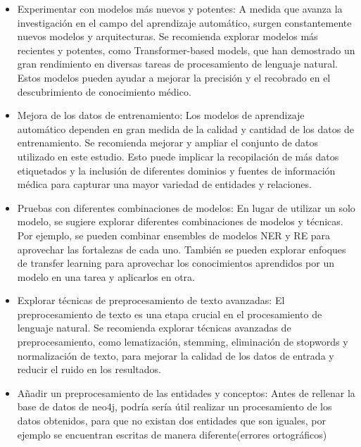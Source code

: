 \documentclass[10pt]{article} %
\begin{document}
	\begin{itemize}
		\item Experimentar con modelos más nuevos y potentes: A medida que avanza la investigación en el campo del aprendizaje automático, surgen constantemente nuevos modelos y arquitecturas. Se recomienda explorar modelos más recientes y potentes, como Transformer-based models, que han demostrado un gran rendimiento en diversas tareas de procesamiento de lenguaje natural. Estos modelos pueden ayudar a mejorar la precisión y el recobrado en el descubrimiento de conocimiento médico.
		\item Mejora de los datos de entrenamiento: Los modelos de aprendizaje automático dependen en gran medida de la calidad y cantidad de los datos de entrenamiento. Se recomienda mejorar y ampliar el conjunto de datos utilizado en este estudio. Esto puede implicar la recopilación de más datos etiquetados y la inclusión de diferentes dominios y fuentes de información médica para capturar una mayor variedad de entidades y relaciones.
		\item Pruebas con diferentes combinaciones de modelos: En lugar de utilizar un solo modelo, se sugiere explorar diferentes combinaciones de modelos y técnicas. Por ejemplo, se pueden combinar ensembles de modelos NER y RE para aprovechar las fortalezas de cada uno. También se pueden explorar enfoques de transfer learning para aprovechar los conocimientos aprendidos por un modelo en una tarea y aplicarlos en otra.
		\item Explorar técnicas de preprocesamiento de texto avanzadas: El preprocesamiento de texto es una etapa crucial en el procesamiento de lenguaje natural. Se recomienda explorar técnicas avanzadas de preprocesamiento, como lematización, stemming, eliminación de stopwords y normalización de texto, para mejorar la calidad de los datos de entrada y reducir el ruido en los resultados.
		\item Añadir un preprocesamiento de las entidades y conceptos: Antes de rellenar la base de datos de neo4j, podría sería 
		útil realizar un procesamiento de los datos obtenidos, para que no existan dos entidades que son iguales, por ejemplo se encuentran escritas de manera diferente(errores ortográficos)
	\end{itemize}
	
\end{document}
